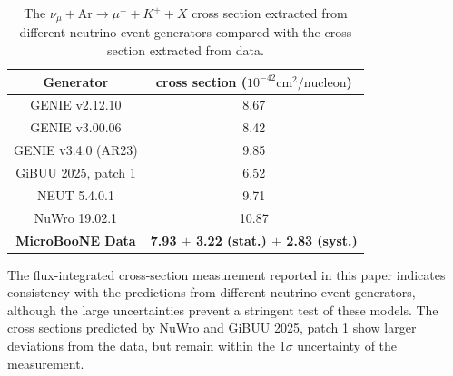 \documentclass[aps,prd,longbibliography,twocolumn,showpacs,superscriptaddress,floatfix,10pt]{revtex4-1}
\begin{document}
\begin{table}[htbp]
    \centering
    \begin{tabular}{c|c}
        \textbf{Generator} & \textbf{cross section ($10^{-42} \text{cm}^2/\text{nucleon}$)} \\ \hline
        GENIE v2.12.10 & 8.67  \\ 
        GENIE v3.00.06 & 8.42  \\
        GENIE v3.4.0 (AR23) & 9.85 \\
        GiBUU 2025, patch 1 & 6.52  \\ 
        NEUT 5.4.0.1 & 9.71  \\ 
        NuWro 19.02.1 & 10.87  \\ \hline
        \textbf{MicroBooNE Data} &  \textbf{7.93 $\pm$ 3.22 (stat.) $\pm$ 2.83 (syst.)}\\ \hline
    \end{tabular}
    \caption{The $\nu_{\mu} + \text{Ar} \rightarrow \mu^{-} + K^{+} + X$ cross section extracted from different neutrino event generators compared with the cross section extracted from data.}
    \label{tab:cross_sections}
\end{table}

The flux-integrated cross-section measurement reported in this paper indicates consistency with the predictions from different neutrino event generators, although the large uncertainties prevent a stringent test of these models. 
The cross sections predicted by NuWro \cite{GOLAN2012499} and GiBUU 2025, patch 1 \cite{gibuu} show larger deviations from the data, but remain within the 1$\sigma$ uncertainty of the measurement.
\end{document}
